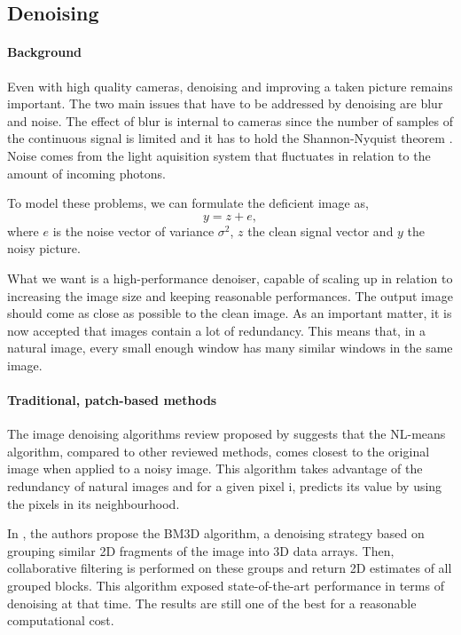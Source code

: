 \subsection{Denoising}

\paragraph{Background}

Even with high quality cameras, denoising and improving a taken picture remains important.
The two main issues that have to be addressed by denoising are blur and noise.
The effect of blur is internal to cameras since the number of samples of the continuous signal is limited and it has to hold the Shannon-Nyquist theorem \cite{buades_review_2005}.
Noise comes from the light aquisition system that fluctuates in relation to the amount of incoming photons.

To model these problems, we can formulate the deficient image as,
\[y = z + e,\]
where \(e\) is the noise vector of variance \(\sigma^2\), \(z\) the clean signal vector and \(y\) the noisy picture.

What we want is a high-performance denoiser, capable of scaling up in relation to increasing the image size and keeping reasonable performances.
The output image should come as close as possible to the clean image.
As an important matter, it is now accepted that images contain a lot of redundancy.
This means that, in a natural image, every small enough window has many similar windows in the same image.

\paragraph{Traditional, patch-based methods}

The image denoising algorithms review proposed by \cite{buades_review_2005} suggests that the NL-means algorithm, compared to other reviewed methods, comes closest to the original image when applied to a noisy image.
This algorithm takes advantage of the redundancy of natural images and for a given pixel i, predicts its value by using the pixels in its neighbourhood.

In \cite{dabov_image_2007}, the authors propose the BM3D algorithm, a denoising strategy based on grouping similar 2D fragments of the image into 3D data arrays. Then, collaborative filtering is performed on these groups and return 2D estimates of all grouped blocks.
This algorithm exposed state-of-the-art performance in terms of denoising at that time.
The results are still one of the best for a reasonable computational cost.

